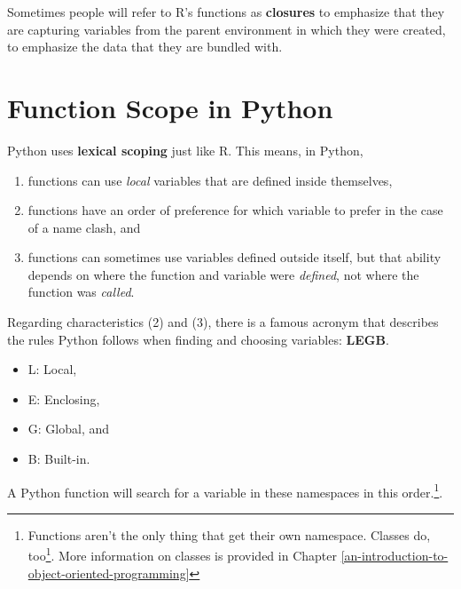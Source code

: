 \documentclass[
  12pt,
  krantz2]{krantz}
\providecommand{\tightlist}{%
  \setlength{\itemsep}{0pt}\setlength{\parskip}{0pt}}
\renewcommand{\href}[2]{#2\footnote{\url{#1}}}
\begin{document}
\begin{rmd-details}
Sometimes people will refer to R's functions as \textbf{closures} to emphasize that they are capturing variables from the parent environment in which they were created, to emphasize the data that they are bundled with.

\end{rmd-details}

\hypertarget{function-scope-in-python}{%
\section{Function Scope in Python}\label{function-scope-in-python}}

Python uses \textbf{lexical scoping} just like R. This means, in Python,

\begin{enumerate}
\def\labelenumi{\arabic{enumi}.}
\tightlist
\item
  functions can use \emph{local} variables that are defined inside themselves,\\
\item
  functions have an order of preference for which variable to prefer in the case of a name clash, and
\item
  functions can sometimes use variables defined outside itself, but that ability depends on where the function and variable were \emph{defined}, not where the function was \emph{called}.
\end{enumerate}

Regarding characteristics (2) and (3), there is a famous acronym that describes the rules Python follows when finding and choosing variables: \textbf{LEGB}.

\begin{itemize}
\tightlist
\item
  L: Local,
\item
  E: Enclosing,
\item
  G: Global, and
\item
  B: Built-in.
\end{itemize}

A Python function will search for a variable in these namespaces in this order.\footnote{Functions aren't the only thing that get their own namespace. \href{https://docs.python.org/3/tutorial/classes.html\#a-first-look-at-classes}{Classes do, too}. More information on classes is provided in Chapter \ref{an-introduction-to-object-oriented-programming}}.
\end{document}
